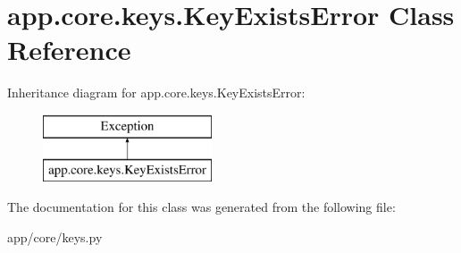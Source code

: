 \hypertarget{classapp_1_1core_1_1keys_1_1_key_exists_error}{}\section{app.\+core.\+keys.\+Key\+Exists\+Error Class Reference}
\label{classapp_1_1core_1_1keys_1_1_key_exists_error}
Inheritance diagram for app.\+core.\+keys.\+Key\+Exists\+Error\+:\begin{figure}[H]
\begin{center}
\leavevmode
\includegraphics[height=2.000000cm]{classapp_1_1core_1_1keys_1_1_key_exists_error}
\end{center}
\end{figure}


The documentation for this class was generated from the following file\+:\begin{DoxyCompactItemize}
\item 
app/core/keys.\+py\end{DoxyCompactItemize}
